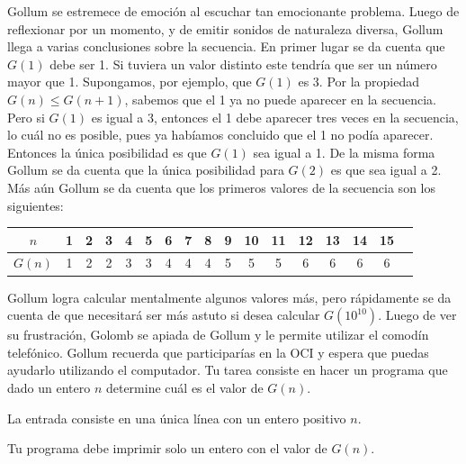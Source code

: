 \documentclass{oci}
\begin{document}
\begin{problemDescription}
Gollum se estremece de emoción al escuchar tan emocionante problema.
Luego de reflexionar por un momento, y de emitir sonidos de naturaleza diversa, Gollum llega a varias conclusiones sobre la secuencia.
En primer lugar se da cuenta que $G(1)$ debe ser 1. 
Si tuviera un valor distinto este tendría que ser un número mayor que 1.
Supongamos, por ejemplo, que $G(1)$ es 3.
Por la propiedad $G(n)\leq G(n+1)$, sabemos que el 1 ya no puede aparecer en la secuencia.
Pero si $G(1)$ es igual a 3, entonces el 1 debe aparecer tres veces en la secuencia, lo cuál no es posible, pues ya habíamos concluido que el 1 no podía aparecer.
Entonces la única posibilidad es que $G(1)$ sea igual a 1.
De la misma forma Gollum se da cuenta que la única posibilidad para $G(2)$ es que sea igual a 2.
Más aún Gollum se da cuenta que los primeros valores de la secuencia son los siguientes:
\begin{center}
  \begin{tabular}{c|cccccccccccccccc}
	$n$ & 1 & 2 & 3 & 4 & 5 & 6 & 7 & 8 & 9 & 10 & 11 & 12 & 13 & 14 & 15 \\
  \hline
	$G(n)$ & 1 & 2 & 2 & 3 & 3 & 4 & 4 & 4 & 5 & 5 & 5 & 6 & 6 & 6 & 6 
  \end{tabular}
\end{center}
Gollum logra calcular mentalmente algunos valores más, pero rápidamente se da cuenta de que necesitará ser más astuto si desea calcular $G(10^{10})$.
Luego de ver su frustración, Golomb se apiada de Gollum y le permite utilizar el comodín telefónico.
Gollum recuerda que participarías en la OCI y espera que puedas ayudarlo utilizando el computador.
Tu tarea consiste en hacer un programa que dado un entero $n$ determine cuál es el valor de $G(n)$.
\end{problemDescription}

\begin{inputDescription}
  La entrada consiste en una única línea con un entero positivo $n$.
\end{inputDescription}

\begin{outputDescription}
  Tu programa debe imprimir solo un entero con el valor de $G(n)$.
\end{outputDescription}
\end{document}
